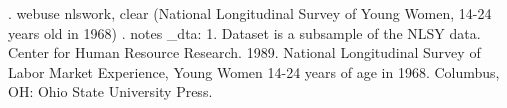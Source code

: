 . webuse nlswork, clear
(National Longitudinal Survey of Young Women, 14-24 years old in 1968)
{\smallskip}
. notes
{\smallskip}
_dta:
  1.  Dataset is a subsample of the NLSY data.  Center for Human Resource Research. 1989. National Longitudinal Survey of Labor Market Experience, Young Women 14-24 years of age in
      1968. Columbus, OH: Ohio State University Press.
{\smallskip}
